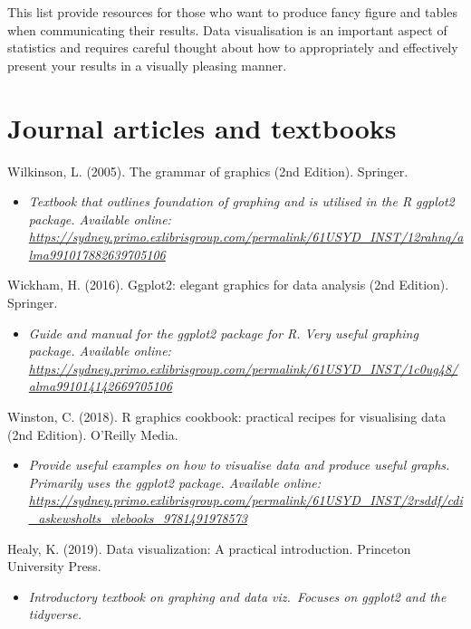 \documentclass[
]{book}
\providecommand{\tightlist}{%
  \setlength{\itemsep}{0pt}\setlength{\parskip}{0pt}}
\begin{document}
This list provide resources for those who want to produce fancy figure and tables when communicating their results. Data visualisation is an important aspect of statistics and requires careful thought about how to appropriately and effectively present your results in a visually pleasing manner.

\hypertarget{journal-articles-and-textbooks-1}{%
\section{Journal articles and textbooks}\label{journal-articles-and-textbooks-1}}

Wilkinson, L. (2005). The grammar of graphics (2nd Edition). Springer.

\begin{itemize}
\tightlist
\item
  \emph{Textbook that outlines foundation of graphing and is utilised in the R ggplot2 package. Available online: \url{https://sydney.primo.exlibrisgroup.com/permalink/61USYD_INST/12rahnq/alma991017882639705106} }
\end{itemize}

Wickham, H. (2016). Ggplot2: elegant graphics for data analysis (2nd Edition). Springer.

\begin{itemize}
\tightlist
\item
  \emph{Guide and manual for the ggplot2 package for R. Very useful graphing package. Available online: \url{https://sydney.primo.exlibrisgroup.com/permalink/61USYD_INST/1c0ug48/alma991014142669705106}}
\end{itemize}

Winston, C. (2018). R graphics cookbook: practical recipes for visualising data (2nd Edition). O'Reilly Media.

\begin{itemize}
\tightlist
\item
  \emph{Provide useful examples on how to visualise data and produce useful graphs. Primarily uses the ggplot2 package. Available online: \url{https://sydney.primo.exlibrisgroup.com/permalink/61USYD_INST/2rsddf/cdi_askewsholts_vlebooks_9781491978573}}
\end{itemize}

Healy, K. (2019). Data visualization: A practical introduction. Princeton University Press.

\begin{itemize}
\tightlist
\item
  \emph{Introductory textbook on graphing and data viz.~Focuses on ggplot2 and the tidyverse.}
\end{itemize}
\end{document}

